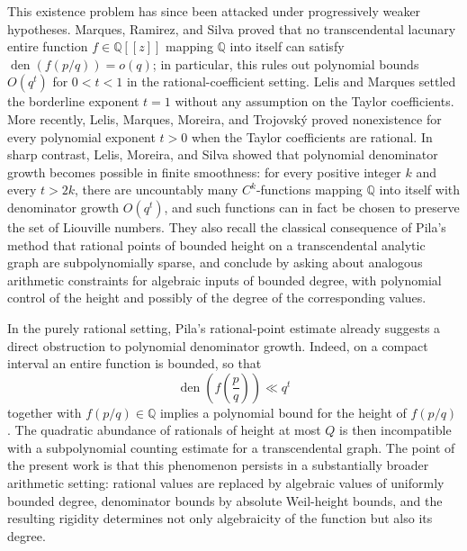\documentclass[11pt]{amsart}
\theoremstyle{remark}
\newcommand{\Q}{\mathbb{Q}}
\DeclareMathOperator{\den}{den}
\begin{document}
This existence problem has since been attacked under progressively weaker hypotheses. Marques, Ramirez, and Silva \cite{MarquesRamirezSilva2016} proved that no transcendental lacunary entire function $f\in\Q[[z]]$ mapping $\Q$ into itself can satisfy $\den(f(p/q))=o(q)$; in particular, this rules out polynomial bounds $O(q^t)$ for $0<t<1$ in the rational-coefficient setting. Lelis and Marques \cite{LelisMarques2020} settled the borderline exponent $t=1$ without any assumption on the Taylor coefficients. More recently, Lelis, Marques, Moreira, and Trojovsk\'y \cite{LelisMarquesMoreiraTrojovsky2024} proved nonexistence for every polynomial exponent $t>0$ when the Taylor coefficients are rational. In sharp contrast, Lelis, Moreira, and Silva \cite{LelisMoreiraSilva2026} showed that polynomial denominator growth becomes possible in finite smoothness: for every positive integer $k$ and every $t>2k$, there are uncountably many $C^k$-functions mapping $\Q$ into itself with denominator growth $O(q^t)$, and such functions can in fact be chosen to preserve the set of Liouville numbers. They also recall the classical consequence of Pila's method that rational points of bounded height on a transcendental analytic graph are subpolynomially sparse, and conclude by asking about analogous arithmetic constraints for algebraic inputs of bounded degree, with polynomial control of the height and possibly of the degree of the corresponding values.

In the purely rational setting, Pila's rational-point estimate already suggests a direct obstruction to polynomial denominator growth. Indeed, on a compact interval an entire function is bounded, so that
\[
\den\!\left(f\!\left(\frac pq\right)\right)\ll q^t
\]
together with $f(p/q)\in\Q$ implies a polynomial bound for the height of $f(p/q)$. The quadratic abundance of rationals of height at most $Q$ is then incompatible with a subpolynomial counting estimate for a transcendental graph. The point of the present work is that this phenomenon persists in a substantially broader arithmetic setting: rational values are replaced by algebraic values of uniformly bounded degree, denominator bounds by absolute Weil-height bounds, and the resulting rigidity determines not only algebraicity of the function but also its degree.
\end{document}
